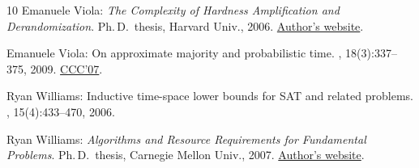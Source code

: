 \begin{thebibliography}{10}
{\sc Emanuele Viola}: {\em The Complexity of Hardness Amplification and
  Derandomization}.
\newblock Ph.\,D.\ thesis, Harvard Univ., 2006.
\newblock \href{https://www.ccs.neu.edu/home/viola/papers/thesis.pdf}{Author's
  website}.

{\sc Emanuele Viola}: On approximate majority and probabilistic time.
, 18(3):337--375, 2009.
\newblock \prelim \href{https://doi.org/10.1109/CCC.2007.16}{CCC'07}.
\newblock [\epfmtdoi{10.1007/s00037-009-0267-3}]

{\sc Ryan Williams}: Inductive time-space lower bounds for {SAT} and related
  problems.
, 15(4):433--470, 2006.
\newblock [\epfmtdoi{10.1007/s00037-007-0221-1}]

{\sc Ryan Williams}: {\em Algorithms and Resource Requirements for Fundamental
  Problems}.
\newblock Ph.\,D.\ thesis, Carnegie Mellon Univ., 2007.
\newblock \href{https://people.csail.mit.edu/rrw/thesis.pdf}{Author's website}.

\end{thebibliography}